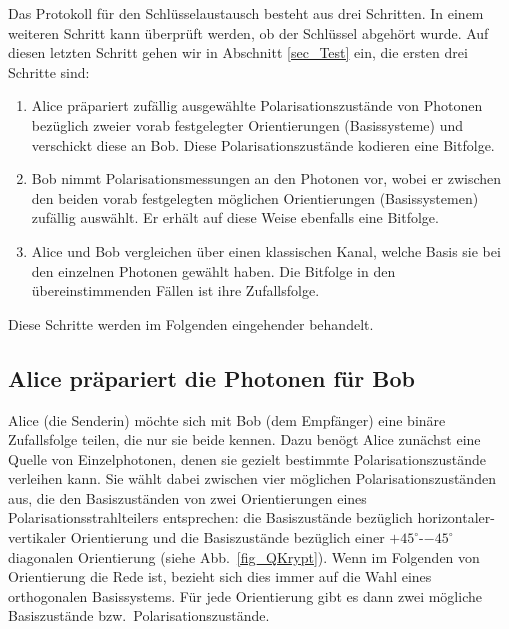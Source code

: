 Das Protokoll f\"ur den Schl\"usselaustausch besteht aus drei Schritten. In einem weiteren Schritt kann
\"uberpr\"uft werden, ob der Schl\"ussel abgeh\"ort wurde. Auf diesen letzten Schritt gehen wir in
Abschnitt \ref{sec_Test} ein, die ersten drei Schritte sind:
\begin{enumerate}
\item
Alice pr\"apariert zuf\"allig ausgew\"ahlte Polarisationszust\"ande von Photonen bez\"uglich 
zweier vorab festgelegter Orientierungen (Basissysteme) 
und verschickt diese an Bob. Diese Polarisationszust\"ande kodieren eine Bitfolge.
\item
Bob nimmt Polarisationsmessungen  an den Photonen vor, wobei er zwischen den beiden 
vorab festgelegten m\"oglichen Orientierungen (Basissystemen) zuf\"allig ausw\"ahlt. Er erh\"alt auf diese
Weise ebenfalls eine Bitfolge.
\item
Alice und Bob vergleichen \"uber einen klassischen Kanal, welche Basis sie bei den einzelnen Photonen
gew\"ahlt haben. Die Bitfolge in den \"ubereinstimmenden F\"allen ist ihre Zufallsfolge. 
\end{enumerate}
Diese Schritte werden im Folgenden eingehender behandelt.

\subsection{Alice pr\"apariert die Photonen f\"ur Bob}

Alice (die Senderin) m\"ochte sich mit  Bob (dem Empf\"anger) eine bin\"are Zufallsfolge teilen, die
nur sie beide kennen. Dazu ben\"ogt Alice zun\"achst eine Quelle von Einzelphotonen, denen 
sie gezielt bestimmte Polarisationszust\"ande verleihen kann. Sie w\"ahlt dabei zwischen vier m\"oglichen
Polarisationszust\"anden aus, die den Basiszust\"anden von zwei Orientierungen eines
Polarisationsstrahlteilers entsprechen: die Basiszust\"ande bez\"uglich
horizontaler-vertikaler Orientierung und die Basiszust\"ande bez\"uglich einer $+45^\circ$-$-45^\circ$ diagonalen
Orientierung (siehe Abb.\ \ref{fig_QKrypt}). Wenn im Folgenden von Orientierung die Rede ist, bezieht
sich dies immer auf die Wahl eines orthogonalen Basissystems. F\"ur jede Orientierung gibt es dann zwei
m\"ogliche Basiszust\"ande bzw.\ Polarisationszust\"ande.

\begin{SCfigure}[50][htb]
\caption{\label{fig_QKrypt}%
Die beiden Orientierungen bzw.\ 
Basissysteme f\"ur die Pr\"aparations- bzw.\ Mess\-an\-ordnungen beim BB84-Protokoll. 
(links) horizontal-vertikal ($h/v$-Basis), (rechts) $+45^\circ$-$-45^\circ$ ($+/-$-Basis).}
\end{SCfigure}

